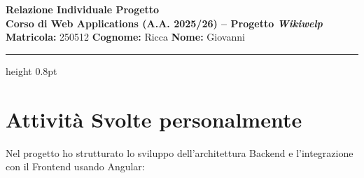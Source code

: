 \documentclass[11pt,a4paper]{article}
\begin{document}
\begin{center}
    {\LARGE \textbf{Relazione Individuale Progetto}}\\[1.2ex]
    {\large \textbf{Corso di Web Applications (A.A. 2025/26) -- Progetto \textit{Wikiwelp}}}\\[1.2ex]
    \textbf{Matricola:} 250512 \quad\textbf{Cognome:} Ricca \quad\textbf{Nome:} Giovanni
\end{center}

\vspace{0.2em}
\hrule height 0.8pt
\vspace{0.4em}

\section{Attività Svolte personalmente}
Nel progetto ho strutturato lo sviluppo dell'architettura Backend e l'integrazione con il Frontend usando Angular:
\end{document}
